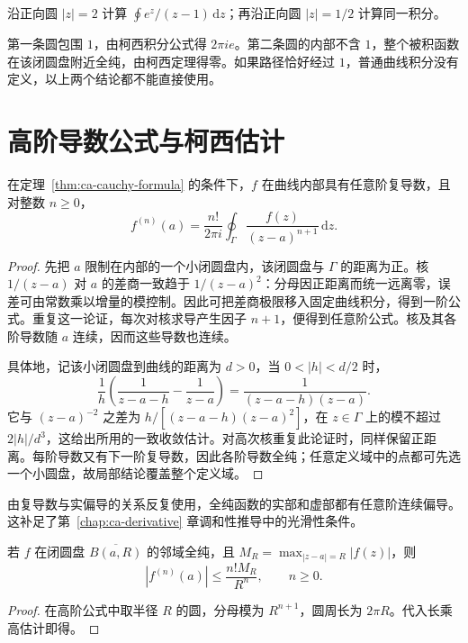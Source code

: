 \begin{example}
沿正向圆 $|z|=2$ 计算 $\oint e^z/(z-1)\,\mathrm dz$；再沿正向圆 $|z|=1/2$ 计算同一积分。
\end{example}
\begin{solve}
第一条圆包围 $1$，由柯西积分公式得 $2\pi i e$。第二条圆的内部不含 $1$，整个被积函数在该闭圆盘附近全纯，由柯西定理得零。如果路径恰好经过 $1$，普通曲线积分没有定义，以上两个结论都不能直接使用。
\end{solve}

\section{高阶导数公式与柯西估计}

\begin{theorem}[高阶导数公式]
\label{thm:ca-higher-cauchy}
在定理~\ref{thm:ca-cauchy-formula} 的条件下，$f$ 在曲线内部具有任意阶复导数，且对整数 $n\ge0$，
\begin{equation}
 f^{(n)}(a)=\frac{n!}{2\pi i}\oint_\Gamma
 \frac{f(z)}{(z-a)^{n+1}}\,\mathrm dz.
 \label{eq:ca-higher-cauchy}
\end{equation}
\end{theorem}
\begin{proof}
先把 $a$ 限制在内部的一个小闭圆盘内，该闭圆盘与 $\Gamma$ 的距离为正。核 $1/(z-a)$ 对 $a$ 的差商一致趋于 $1/(z-a)^2$：分母因正距离而统一远离零，误差可由常数乘以增量的模控制。因此可把差商极限移入固定曲线积分，得到一阶公式。重复这一论证，每次对核求导产生因子 $n+1$，便得到任意阶公式。核及其各阶导数随 $a$ 连续，因而这些导数也连续。

具体地，记该小闭圆盘到曲线的距离为 $d>0$，当 $0<|h|<d/2$ 时，
\[
 \frac1h\left(\frac1{z-a-h}-\frac1{z-a}\right)
 =\frac1{(z-a-h)(z-a)}.
\]
它与 $(z-a)^{-2}$ 之差为 $h/[(z-a-h)(z-a)^2]$，在 $z\in\Gamma$ 上的模不超过 $2|h|/d^3$，这给出所用的一致收敛估计。对高次核重复此论证时，同样保留正距离。每阶导数又有下一阶复导数，因此各阶导数全纯；任意定义域中的点都可先选一个小圆盘，故局部结论覆盖整个定义域。
\end{proof}

由复导数与实偏导的关系反复使用，全纯函数的实部和虚部都有任意阶连续偏导。这补足了第~\ref{chap:ca-derivative} 章调和性推导中的光滑性条件。

\begin{corollary}[柯西估计]
\label{cor:ca-cauchy-estimate}
若 $f$ 在闭圆盘 $\overline{B(a,R)}$ 的邻域全纯，且 $M_R=\max_{|z-a|=R}|f(z)|$，则
\begin{equation}
 |f^{(n)}(a)|\le\frac{n!M_R}{R^n},\qquad n\ge0.
 \label{eq:ca-cauchy-estimate}
\end{equation}
\end{corollary}
\begin{proof}
在高阶公式中取半径 $R$ 的圆，分母模为 $R^{n+1}$，圆周长为 $2\pi R$。代入长乘高估计即得。
\end{proof}

